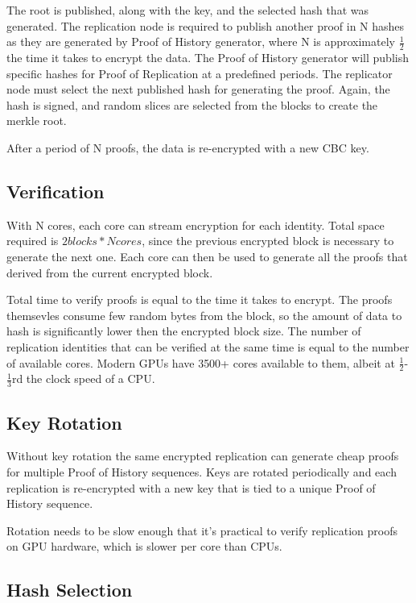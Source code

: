 \documentclass[12pt]{article}
\begin{document}
The root is published, along with the key, and the selected hash that was generated. The replication node is required to publish another proof in N hashes as they are generated by Proof of History generator, where N is approximately \(\frac{1}{2}\) the time it takes to encrypt the data. The Proof of History generator will publish specific hashes for Proof of Replication at a predefined periods. The replicator node must select the next published hash for generating the proof. Again, the hash is signed, and random slices are selected from the blocks to create the merkle root.

After a period of N proofs, the data is re-encrypted with a new CBC key.
\subsection{Verification}

With N cores, each core can stream encryption for each identity. Total space required is \(2 blocks * N cores\), since the previous encrypted block is necessary to generate the next one. Each core can then be used to generate all the proofs that derived from the current encrypted block.

Total time to verify proofs is equal to the time it takes to encrypt. The proofs themsevles consume few random bytes from the block, so the amount of data to hash is significantly lower then the encrypted block size.  The number of replication identities that can be verified at the same time is equal to the number of available cores. Modern GPUs have 3500+ cores available to them, albeit at \(\frac{1}{2}\)-\(\frac{1}{3}\)rd the clock speed of a CPU.

\subsection{Key Rotation}

Without key rotation the same encrypted replication can generate cheap proofs for multiple Proof of History sequences. Keys are rotated periodically and each replication is re-encrypted with a new key that is tied to a unique Proof of History sequence.

Rotation needs to be slow enough that it’s practical to verify replication proofs on GPU hardware, which is slower per core than CPUs.

\subsection{Hash Selection}\label{hashselection}
\end{document}

